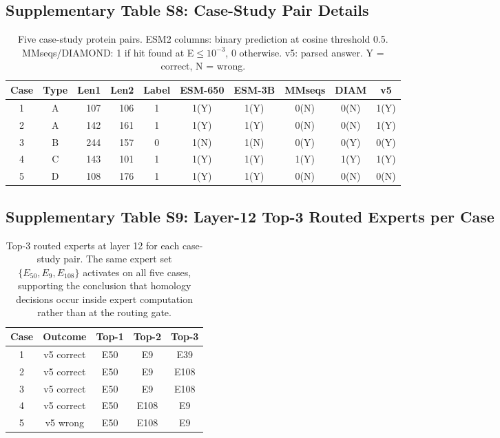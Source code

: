 \documentclass[11pt]{article}
\begin{document}
\subsection{Supplementary Table S8: Case-Study Pair Details}

\begin{table}[H]
\centering
\small
\caption{Five case-study protein pairs. ESM2 columns: binary prediction at cosine threshold 0.5. MMseqs/DIAMOND: 1 if hit found at E$\leq 10^{-3}$, 0 otherwise. v5: parsed answer. Y = correct, N = wrong.}
\begin{tabular}{c c r r c c c c c c}
\toprule
\textbf{Case} & \textbf{Type} & \textbf{Len1} & \textbf{Len2} & \textbf{Label} & \textbf{ESM-650} & \textbf{ESM-3B} & \textbf{MMseqs} & \textbf{DIAM} & \textbf{v5} \\
\midrule
1 & A & 107 & 106 & 1 & 1(Y) & 1(Y) & 0(N) & 0(N) & 1(Y) \\
2 & A & 142 & 161 & 1 & 1(Y) & 1(Y) & 0(N) & 0(N) & 1(Y) \\
3 & B & 244 & 157 & 0 & 1(N) & 1(N) & 0(Y) & 0(Y) & 0(Y) \\
4 & C & 143 & 101 & 1 & 1(Y) & 1(Y) & 1(Y) & 1(Y) & 1(Y) \\
5 & D & 108 & 176 & 1 & 1(Y) & 1(Y) & 0(N) & 0(N) & 0(N) \\
\bottomrule
\end{tabular}
\end{table}

\subsection{Supplementary Table S9: Layer-12 Top-3 Routed Experts per Case}

\begin{table}[H]
\centering
\caption{Top-3 routed experts at layer 12 for each case-study pair. The same expert set $\{E_{50}, E_9, E_{108}\}$ activates on all five cases, supporting the conclusion that homology decisions occur inside expert computation rather than at the routing gate.}
\begin{tabular}{c c c c c}
\toprule
\textbf{Case} & \textbf{Outcome} & \textbf{Top-1} & \textbf{Top-2} & \textbf{Top-3} \\
\midrule
1 & v5 correct   & E50 & E9  & E39  \\
2 & v5 correct   & E50 & E9  & E108 \\
3 & v5 correct   & E50 & E9  & E108 \\
4 & v5 correct   & E50 & E108 & E9  \\
5 & v5 wrong     & E50 & E108 & E9  \\
\bottomrule
\end{tabular}
\end{table}
\end{document}
